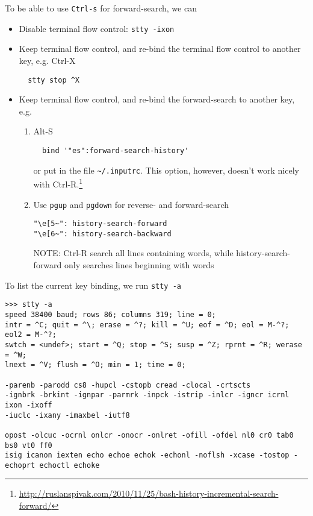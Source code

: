 To be able to use \verb!Ctrl-s! for forward-search, we can 
\begin{itemize}
  \item Disable terminal flow control: \verb!stty -ixon!
  \item Keep terminal flow control, and re-bind the terminal flow control to
  another key, e.g. Ctrl-X
  \begin{verbatim}
  stty stop ^X 
  \end{verbatim}
  
  \item Keep terminal flow control, and re-bind the forward-search to another
  key, e.g. 
  
  \begin{enumerate}
    \item Alt-S
  \begin{verbatim}
  bind '"es":forward-search-history'
  \end{verbatim}
  or put in the file \verb!~/.inputrc!. This option, however, doesn't work
  nicely with
  Ctrl-R.\footnote{\url{http://ruslanspivak.com/2010/11/25/bash-history-incremental-search-forward/}}
  
     \item Use \verb!pgup! and \verb!pgdown! for reverse- and forward-search
  \begin{verbatim}
"\e[5~": history-search-forward
"\e[6~": history-search-backward
  \end{verbatim}
NOTE: Ctrl-R search all lines containing words, while history-search-forward
only searches lines beginning with words
    \end{enumerate}
\end{itemize}

\begin{mdframed}

To list the current key binding, we run \verb!stty -a! 

{\tiny
\begin{verbatim}
>>> stty -a
speed 38400 baud; rows 86; columns 319; line = 0;
intr = ^C; quit = ^\; erase = ^?; kill = ^U; eof = ^D; eol = M-^?; eol2 = M-^?; 
swtch = <undef>; start = ^Q; stop = ^S; susp = ^Z; rprnt = ^R; werase = ^W; 
lnext = ^V; flush = ^O; min = 1; time = 0;

-parenb -parodd cs8 -hupcl -cstopb cread -clocal -crtscts
-ignbrk -brkint -ignpar -parmrk -inpck -istrip -inlcr -igncr icrnl ixon -ixoff 
-iuclc -ixany -imaxbel -iutf8

opost -olcuc -ocrnl onlcr -onocr -onlret -ofill -ofdel nl0 cr0 tab0 bs0 vt0 ff0
isig icanon iexten echo echoe echok -echonl -noflsh -xcase -tostop -echoprt echoctl echoke
\end{verbatim}
}

\end{mdframed}

